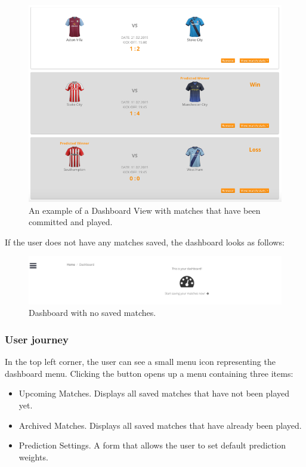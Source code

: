 \begin{figure}[H]
	\begin{center}
		\includegraphics[width=.90\textwidth]{impl/images/dashboardCommittedMatches}
		\caption{An example of a Dashboard View with matches that have been committed and played.} \label{fig:dashboardcommittedmatches}
	\end{center}
\end{figure}

If the user does not have any matches saved, the dashboard looks as follows:

\begin{figure}[H]
	\begin{center}
		\includegraphics[width=.90\textwidth]{impl/images/noSavedMatches}
		\caption{Dashboard with no saved matches.} \label{fig:using: nosavedmatches}
	\end{center}
\end{figure}

\subsubsection*{User journey}
\label{subsec:dashboarduserjourney}
In the top left corner, the user can see a small menu icon representing the dashboard menu. Clicking the button opens up a menu containing three items:

\begin{itemize}
	\item{Upcoming Matches. Displays all saved matches that have not been played yet. }
	\item{Archived Matches. Displays all saved matches that have already been played.}
	\item{Prediction Settings. A form that allows the user to set default prediction weights.}
\end{itemize}

